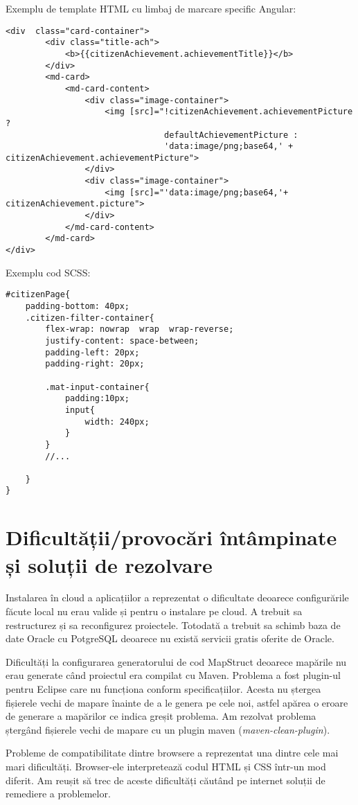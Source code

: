 Exemplu de template HTML cu limbaj de marcare specific Angular:
\begin {lstlisting}
<div  class="card-container">
		<div class="title-ach">
			<b>{{citizenAchievement.achievementTitle}}</b>
        </div>
        <md-card>
            <md-card-content>
                <div class="image-container">
                    <img [src]="!citizenAchievement.achievementPicture ? 
                                defaultAchievementPicture :
                                'data:image/png;base64,' + citizenAchievement.achievementPicture">
                </div>
                <div class="image-container">
                    <img [src]="'data:image/png;base64,'+ citizenAchievement.picture">
                </div>
            </md-card-content>
        </md-card>
</div>
\end{lstlisting}

Exemplu cod SCSS:
\begin {lstlisting}
#citizenPage{
    padding-bottom: 40px;
    .citizen-filter-container{
        flex-wrap: nowrap  wrap  wrap-reverse;
        justify-content: space-between;
        padding-left: 20px;
        padding-right: 20px;

        .mat-input-container{
            padding:10px;
            input{
                width: 240px;
            }
        }
		//...
     
    }
}
\end{lstlisting}

\section{Dificultății/provocări întâmpinate și soluții de rezolvare}
Instalarea în cloud a aplicațiilor a reprezentat o dificultate deoarece configurările făcute local
nu erau valide și pentru o instalare pe cloud. A trebuit sa restructurez și sa reconfigurez proiectele.
Totodată a trebuit sa schimb baza de date Oracle cu PotgreSQL deoarece nu există servicii gratis oferite de 
Oracle.

Dificultăți la configurarea generatorului de cod MapStruct deoarece mapările nu erau
generate când proiectul era compilat cu Maven. Problema a fost plugin-ul pentru Eclipse care nu
funcționa conform specificațiilor. Acesta nu ștergea fișierele vechi de mapare înainte de a le genera
pe cele noi, astfel apărea o eroare de generare a mapărilor ce indica greșit problema. Am rezolvat
problema ștergând fișierele vechi de mapare cu un plugin maven (\textit{maven-clean-plugin}).

Probleme de compatibilitate dintre browsere a reprezentat una dintre cele mai mari dificultăți.
Browser-ele interpretează codul HTML și CSS într-un mod diferit. Am reușit să trec de aceste dificultăți 
căutând pe internet soluții de remediere a problemelor.


